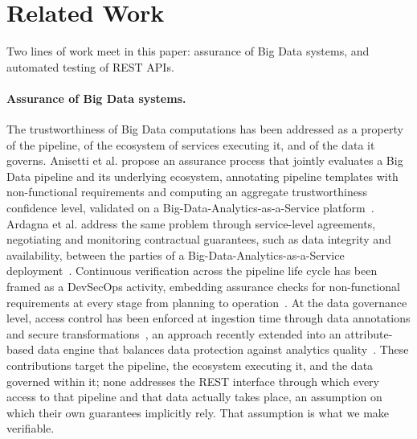 \documentclass[
]{ceurart}
\begin{document}
\lipsum[1-2] %



\section{Related Work}

Two lines of work meet in this paper: assurance of Big Data systems, and automated testing of REST APIs.

\paragraph{Assurance of Big Data systems.}
The trustworthiness of Big Data computations has been addressed as a property of the pipeline, of the ecosystem of services executing it, and of the data it governs.
Anisetti et al. propose an assurance process that jointly evaluates a Big Data pipeline and its underlying ecosystem, annotating pipeline templates with non-functional requirements and computing an aggregate trustworthiness confidence level, validated on a Big-Data-Analytics-as-a-Service platform~\cite{anisettiAssuranceProcessBig2023}.
Ardagna et al. address the same problem through service-level agreements, negotiating and monitoring contractual guarantees, such as data integrity and availability, between the parties of a Big-Data-Analytics-as-a-Service deployment~\cite{ardagnaBigDataAssurance2023}.
Continuous verification across the pipeline life cycle has been framed as a DevSecOps activity, embedding assurance checks for non-functional requirements at every stage from planning to operation~\cite{anisettiDevSecOpsbasedAssuranceProcess2022}.
At the data governance level, access control has been enforced at ingestion time through data annotations and secure transformations~\cite{anisettiDynamicScalableEnforcement2021}, an approach recently extended into an attribute-based data engine that balances data protection against analytics quality~\cite{polimenoBalancingProtectionQuality2025}.
These contributions target the pipeline, the ecosystem executing it, and the data governed within it; none addresses the REST interface through which every access to that pipeline and that data actually takes place, an assumption on which their own guarantees implicitly rely.
That assumption is what we make verifiable.
\end{document}
